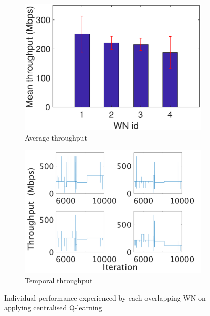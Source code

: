 \documentclass[12pt, a4paper,twoside]{tesi_upf}
\begin{document}
			\begin{figure}[t!]
				\centering
				\begin{subfigure}[b]{0.4\textwidth}
					\includegraphics[width=\textwidth]{images/proportional_fairness_qlearning_avg_tpt}
					\caption{Average throughput}
					\label{fig:proportional_fairness_qlearning_avg_tpt}
				\end{subfigure}
				\begin{subfigure}[b]{0.4\textwidth}
					\includegraphics[width=\textwidth]{images/proportional_fairness_qlearning_ind_tpt}
					\caption{Temporal throughput}
					\label{fig:proportional_fairness_qlearning_ind_tpt}
				\end{subfigure}		
				\caption{Individual performance experienced by each overlapping WN on applying centralised Q-learning}
				\label{fig:ql_performance_centralised}
			\end{figure}
			
\end{document}
